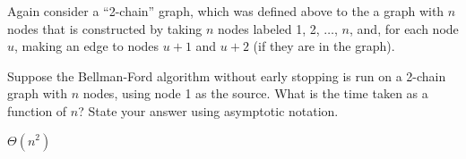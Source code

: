 \begin{prob}
    Again consider a ``2-chain'' graph, which was defined above to the a graph
    with $n$ nodes that is constructed by taking $n$ nodes labeled 1, 2, $\ldots$,
    $n$, and, for each node $u$, making an edge to nodes $u + 1$ and $u + 2$
    (if they are in the graph).

    Suppose the Bellman-Ford algorithm without early stopping is run on a
    2-chain graph with $n$ nodes, using node 1 as the source. What is the time
    taken as a function of $n$? State your answer using asymptotic notation.

    \begin{soln}
        $\Theta(n^2)$
    \end{soln}

\end{prob}
